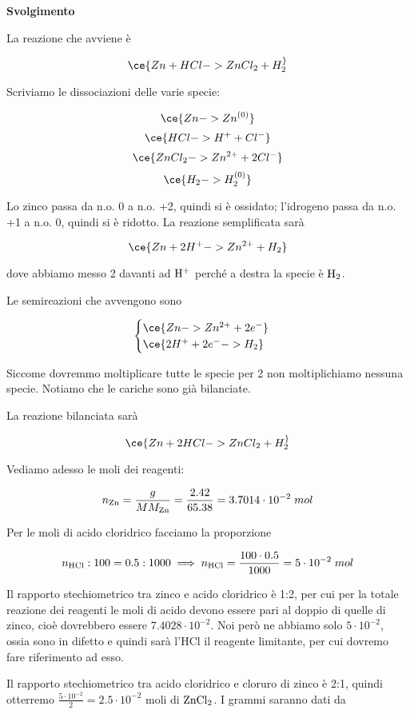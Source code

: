 \vspace{0.2cm}\large\textbf{Svolgimento}\normalsize

\vspace{0.2cm}La reazione che avviene è

$$\ce{Zn + HCl -> ZnCl_2 + H_2 ^}$$

Scriviamo le dissociazioni delle varie specie:

$$\ce{Zn -> Zn^{(0)}}$$
$$\ce{HCl -> H^+ + Cl^-}$$
$$\ce{ZnCl_2 -> Zn^{2+} + 2Cl^-}$$
$$\ce{H_2 -> H_2^{(0)}}$$

Lo zinco passa da n.o. 0 a n.o. +2, quindi si è ossidato; l'idrogeno passa da n.o. +1 a n.o. 0, quindi si è ridotto. La reazione semplificata sarà

$$\ce{Zn + 2H^+ -> Zn^{2+} + H_2}$$

dove abbiamo messo 2 davanti ad $\rm H^+$ perché a destra la specie è $\rm H_2$.

Le semireazioni che avvengono sono

$$\begin{cases}
    \ce{Zn -> Zn^{2+} + 2e^-}\\
    \ce{2H^{+} + 2e^- -> H_2}
\end{cases}$$

Siccome dovremmo moltiplicare tutte le specie per 2 non moltiplichiamo nessuna specie. Notiamo che le cariche sono già bilanciate.

La reazione bilanciata sarà

$$\ce{Zn + 2HCl -> ZnCl_2 + H_2 ^}$$

Vediamo adesso le moli dei reagenti:

$$n_{\rm Zn}=\frac{g}{MM_{\rm Zn}}=\frac{2.42}{65.38}=3.7014 \cdot 10^{-2}\;mol$$

Per le moli di acido cloridrico facciamo la proporzione

$$n_{\rm HCl}:100=0.5:1000
\implies
n_{\rm HCl}=\frac{100 \cdot 0.5}{1000}=5 \cdot 10^{-2}\;mol$$

Il rapporto stechiometrico tra zinco e acido cloridrico è 1:2, per cui per la totale reazione dei reagenti le moli di acido devono essere pari al doppio di quelle di zinco, cioè dovrebbero essere $7.4028 \cdot 10^{-2}$. Noi però ne abbiamo solo $5 \cdot 10^{-2}$, ossia sono in difetto e quindi sarà l'HCl il reagente limitante, per cui dovremo fare riferimento ad esso.

Il rapporto stechiometrico tra acido cloridrico e cloruro di zinco è 2:1, quindi otterremo $\frac{5\cdot 10^{-2}}{2}=2.5 \cdot 10^{-2}$ moli di $\rm ZnCl_2$. I grammi saranno dati da

